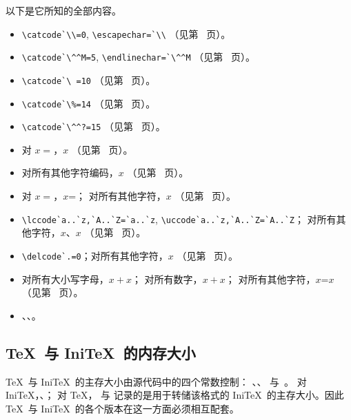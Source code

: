 \documentclass[a4paper]{rapport3}
\def\IniTeX{Ini\TeX}\def\LamsTeX{LAMS\TeX}\def\VirTeX{Vir\TeX}
\begin{document}
以下是它所知的全部内容。
\begin{itemize} \mathsurround=1.5pt
\item \verb>\catcode`\\=0>, \verb>\escapechar=`\\>
      （见第~\pageref{ini:esc} 页）。
\item \verb>\catcode`\^^M=5>, \verb>\endlinechar=`\^^M>
      （见第~\pageref{ini:eol} 页）。
\item \verb>\catcode`\ =10>
      （见第~\pageref{ini:sp} 页）。
\item \verb>\catcode`\%=14>
      （见第~\pageref{ini:comm} 页）。
\item \verb>\catcode`\^^?=15>
      （见第~\pageref{ini:invalid} 页）。
\item 对 $x={}$，$x$
      （见第~\pageref{ini:let} 页）。
\item 对所有其他字符编码，$x$\n
      （见第~\pageref{ini:other} 页）。
\item 对 $x={}$，$x$=；
      对所有其他字符，$x$
      （见第~\pageref{ini:sf} 页）。
\item \verb>\lccode`a..`z,`A..`Z=`a..`z>, \verb>\uccode`a..`z,`A..`Z=`A..`Z>；
      对所有其他字符，$x$、$x$
      （见第~\pageref{ini:uclc} 页）。
\item \verb>\delcode`.=0>；对所有其他字符，$x$
      （见第~\pageref{ini:del} 页）。
\item 对所有大小写字母，$x$${}+x$；
      对所有数字，$x$${}+x$；
      对所有其他字符，$x$\n=$x$
      （见第~\pageref{ini:fam} 页）。
\item {}、、。
\end{itemize}

\subsection{\TeX\ 与 \IniTeX\ 的内存大小}

\TeX\ 与 \IniTeX\ 的主存大小由源代码中的四个常数控制：
、、 与~。
对 Ini\TeX，、；
对 \TeX， 与  记录的是用于转储该格式的
Ini\TeX\ 的主存大小。因此 \TeX\ 与 \IniTeX\ 的各个版本在这一方面必须相互配套。
\end{document}
